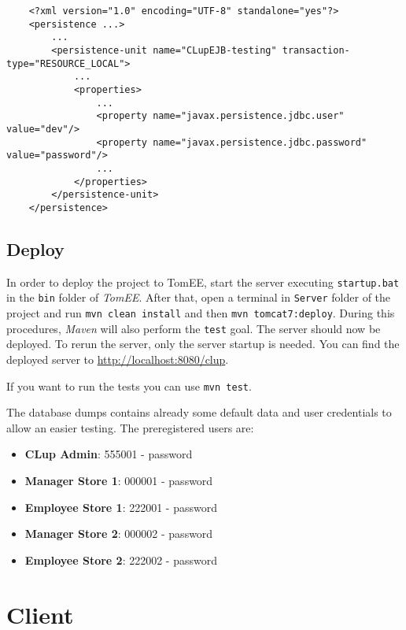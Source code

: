 \begin{lstlisting}
	<?xml version="1.0" encoding="UTF-8" standalone="yes"?>
	<persistence ...>
		...
		<persistence-unit name="CLupEJB-testing" transaction-type="RESOURCE_LOCAL">
			...
			<properties>
				...
				<property name="javax.persistence.jdbc.user" value="dev"/>
				<property name="javax.persistence.jdbc.password" value="password"/>
				...
			</properties>
		</persistence-unit>
	</persistence>
\end{lstlisting}

\clearpage

\subsection{Deploy}
In order to deploy the project to TomEE, start the server executing \verb|startup.bat| in the \verb|bin| folder of \textit{TomEE}.\newline
After that, open a terminal in \verb|Server| folder of the project and run \verb|mvn clean install| and then \verb|mvn tomcat7:deploy|.\newline
During this procedures, \textit{Maven} will also perform the \verb|test| goal.\newline
The server should now be deployed. To rerun the server, only the server startup is needed.\newline
You can find the deployed server to \href{http://localhost:8080/clup}{http://localhost:8080/clup}.

If you want to run the tests you can use \verb|mvn test|.

The database dumps contains already some default data and user credentials to allow an easier testing.\newline
The preregistered users are:
\begin{itemize}
	\item \textbf{CLup Admin}: 555001 - password
	\item \textbf{Manager Store 1}: 000001 - password
	\item \textbf{Employee Store 1}: 222001 - password
	\item \textbf{Manager Store 2}: 000002 - password
	\item \textbf{Employee Store 2}: 222002 - password
\end{itemize}

\section{Client}
